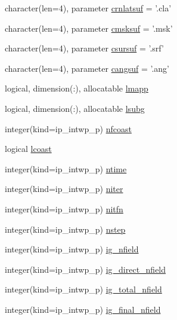 \begin{DoxyCompactItemize}
\item 
character(len=4), parameter \hyperlink{classmod__oasis__namcouple_acdc7f0d582616ee9e18470aad433ed3a}{crnlatsuf} = '.cla'
\item 
character(len=4), parameter \hyperlink{classmod__oasis__namcouple_aeea3ba680d5ba05a432c12d64c68c8af}{cmsksuf} = '.msk'
\item 
character(len=4), parameter \hyperlink{classmod__oasis__namcouple_adf2c151a84c37bd7cd93867305b4f70b}{csursuf} = '.srf'
\item 
character(len=4), parameter \hyperlink{classmod__oasis__namcouple_a4b921aeee4d921557ab0cd2f0e541dad}{cangsuf} = '.ang'
\item 
logical, dimension(\+:), allocatable \hyperlink{classmod__oasis__namcouple_a8eca7c715a39c523e00ed2be0612950d}{lmapp}
\item 
logical, dimension(\+:), allocatable \hyperlink{classmod__oasis__namcouple_acda1605129987d656360e1ed81e8d199}{lsubg}
\item 
integer(kind=ip\+\_\+intwp\+\_\+p) \hyperlink{classmod__oasis__namcouple_a57f1b6f111a5257a4d6f5a4b18fa6250}{nfcoast}
\item 
logical \hyperlink{classmod__oasis__namcouple_a7657e0f9b495e291f26dc31b4f6145aa}{lcoast}
\item 
integer(kind=ip\+\_\+intwp\+\_\+p) \hyperlink{classmod__oasis__namcouple_a8a962108487c3ca092633bd4292dbfd6}{ntime}
\item 
integer(kind=ip\+\_\+intwp\+\_\+p) \hyperlink{classmod__oasis__namcouple_a6246780a56635119fd8f7935456b06cf}{niter}
\item 
integer(kind=ip\+\_\+intwp\+\_\+p) \hyperlink{classmod__oasis__namcouple_a1e5b5efd046e5ab959fba026bd645945}{nitfn}
\item 
integer(kind=ip\+\_\+intwp\+\_\+p) \hyperlink{classmod__oasis__namcouple_a66c36f23a77081749dc9e7993b0277f3}{nstep}
\item 
integer(kind=ip\+\_\+intwp\+\_\+p) \hyperlink{classmod__oasis__namcouple_a674f201daa7f2e1ba4c71221bda91d9c}{ig\+\_\+nfield}
\item 
integer(kind=ip\+\_\+intwp\+\_\+p) \hyperlink{classmod__oasis__namcouple_a531825c07a164f6139e5eebd59e295a2}{ig\+\_\+direct\+\_\+nfield}
\item 
integer(kind=ip\+\_\+intwp\+\_\+p) \hyperlink{classmod__oasis__namcouple_a3de3e6eb2bf1e81d77e9c117b7d5985f}{ig\+\_\+total\+\_\+nfield}
\item 
integer(kind=ip\+\_\+intwp\+\_\+p) \hyperlink{classmod__oasis__namcouple_a7cf04d6fb678ee65b7fbedc56a0d680a}{ig\+\_\+final\+\_\+nfield}

\end{DoxyCompactItemize}
